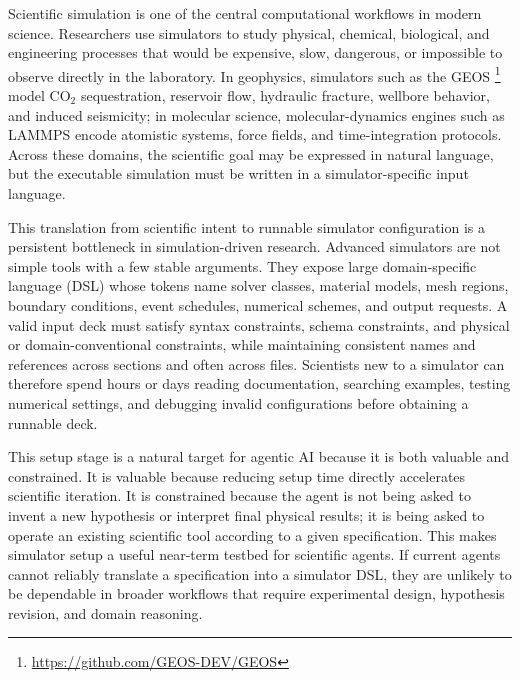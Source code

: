 \documentclass{article}
\begin{document}
Scientific simulation is one of the central computational workflows in modern science. Researchers use simulators to study physical, chemical, biological, and engineering processes that would be expensive, slow, dangerous, or impossible to observe directly in the laboratory. In geophysics, simulators such as the GEOS \footnote{\url{https://github.com/GEOS-DEV/GEOS}}~\citep{geos2024} model CO$_2$ sequestration, reservoir flow, hydraulic fracture, wellbore behavior, and induced seismicity; in molecular science, molecular-dynamics engines such as LAMMPS \citep{holbrook2026lammps} encode atomistic systems, force fields, and time-integration protocols. Across these domains, the scientific goal may be expressed in natural language, but the executable simulation must be written in a simulator-specific input language.

This translation from scientific intent to runnable simulator configuration is a persistent bottleneck in simulation-driven research. Advanced simulators are not simple tools with a few stable arguments. They expose large domain-specific language (DSL) whose tokens name solver classes, material models, mesh regions, boundary conditions, event schedules, numerical schemes, and output requests. A valid input deck must satisfy syntax constraints, schema constraints, and physical or domain-conventional constraints, while maintaining consistent names and references across sections and often across files. Scientists new to a simulator can therefore spend hours or days reading documentation, searching examples, testing numerical settings, and debugging invalid configurations before obtaining a runnable deck.

This setup stage is a natural target for agentic AI because it is both valuable and constrained. It is valuable because reducing setup time directly accelerates scientific iteration. It is constrained because the agent is not being asked to invent a new hypothesis or interpret final physical results; it is being asked to operate an existing scientific tool according to a given specification. This makes simulator setup a useful near-term testbed for scientific agents. If current agents cannot reliably translate a specification into a simulator DSL, they are unlikely to be dependable in broader workflows that require experimental design, hypothesis revision, and domain reasoning.
\end{document}
